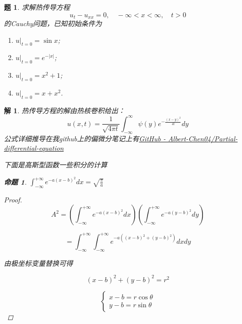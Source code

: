 \documentclass[12pt,a4paper]{article}
\newtheorem{problem}{题}
\newtheorem*{solution}{解}
\newtheorem{example}{命题}
\begin{document}
\newpage
\begin{problem}
	求解热传导方程
	\[
	u_t - u_{xx} = 0, \quad -\infty < x < \infty, \quad t > 0
	\]
	的Cauchy问题，已知初始条件为
	\begin{enumerate}[label=(\arabic*)]
		\item \( u|_{t=0} = \sin x \);
		\item \( u|_{t=0} = e^{-|x|} \);
		\item \( u|_{t=0} = x^2 + 1 \);
		\item \( u|_{t=0} = x + x^2 \).
	\end{enumerate}
\end{problem}

\begin{solution}

	热传导方程的解由热核卷积给出：
	\[
	u(x,t) = \frac{1}{\sqrt{4\pi t}} \int_{-\infty}^\infty \psi(y) e^{-\frac{(x-y)^2}{4t}} dy
	\]
	公式详细推导在我github上的偏微分笔记上有\href{https://github.com/Albert-Chen04/Partial-differential-equation}{GitHub - Albert-Chen04/Partial-differential-equation}
	
	下面是高斯型函数一些积分的计算
	
	
	
	\begin{example}
		\label{ex:1}
	$	\int_{-\infty}^{+\infty} e^{-a(x-b)^2} dx = \sqrt{\frac{\pi}{a}}$
	\end{example}
	
	
	\begin{proof}
		\begin{equation*}
		A^2 = \left( \int_{-\infty}^{+\infty} e^{-a(x-b)^2} dx \right) \left( \int_{-\infty}^{+\infty} e^{-a(y-b)^2} dy \right)
	\end{equation*}
	
	\begin{equation*}
		= \int_{-\infty}^{+\infty} \int_{-\infty}^{+\infty} e^{-a((x-b)^2 + (y-b)^2)} dx dy
	\end{equation*}
	
	由极坐标变量替换可得
	
	\begin{equation*}
		(x - b)^2 + (y - b)^2 = r^2
	\end{equation*}
	
	\begin{equation*}
		\begin{cases}
			x - b = r \cos\theta \\
			y - b = r \sin\theta
		\end{cases}
	\end{equation*}
	

\end{proof}
\end{solution}
\end{document}
